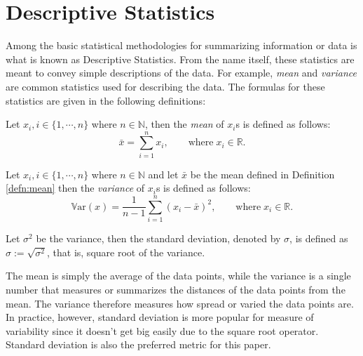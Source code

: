 \section{Descriptive Statistics}\label{sec:descriptive_stat_method}
Among the basic statistical methodologies for summarizing information or data is what is known as Descriptive Statistics. From the name itself, these statistics are meant to convey simple descriptions of the data. For example, \textit{mean} and \textit{variance} are common statistics used for describing the data. The formulas for these statistics are given in the following definitions:
\begin{defn}[Mean]\label{defn:mean}
Let $x_i, i\in\{1,\cdots,n\}$ where $n\in\mathbb{N}$, then the \textit{mean} of $x_i$s is defined as follows:
\begin{equation}
    \bar{x} = \sum_{i=1}^n x_i, \qquad\text{where}\;x_i \in\mathbb{R}.
\end{equation}
\end{defn}
\begin{defn}[Variance]
    Let $x_i, i\in\{1,\cdots,n\}$ where $n\in\mathbb{N}$ and let $\bar{x}$ be the mean defined in Definition \ref{defn:mean} then the \textit{variance} of $x_i$s is defined as follows:
    \begin{equation}
        \mathbb{V}\text{ar}(x) = \frac{1}{n-1}\sum_{i=1}^n (x_i-\bar{x})^2, \qquad\text{where}\;x_i \in\mathbb{R}.
    \end{equation}    
\end{defn}
\begin{defn}
Let $\sigma^2$ be the variance, then the standard deviation, denoted by $\sigma$, is defined as $\sigma:=\sqrt{\sigma^2}$, that is, square root of the variance.    
\end{defn}
The mean is simply the average of the data points, while the variance is a single number that measures or summarizes the distances of the data points from the mean. The variance therefore measures how spread or varied the data points are. In practice, however, standard deviation is more popular for measure of variability since it doesn't get big easily due to the square root operator. Standard deviation is also the preferred metric for this paper.
